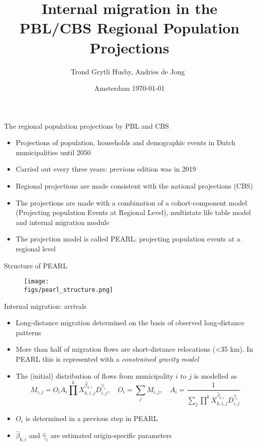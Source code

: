 \documentclass[final, 12pt, aspectratio=169, xcolor={dvipsnames}]{beamer}
\title[PEARL]{Internal migration in the PBL/CBS Regional Population Projections}
\subtitle[PEARL]{}
\author[T. Husby]{Trond Grytli Husby, Andries de Jong\ }
\institute[PBL]{
  Netherlands Environmental Assesment Agency (PBL) \\[5ex]
  \texttt{trond.husby@pbl.nl}
}
\date[\today]{Amsterdam \today}
\newcommand*{\figs}{../figs}%
\begin{document}
\beamertemplatenavigationsymbolsempty

{

  \begin{frame}
    \titlepage
  \end{frame}
}

\begin{frame}{The regional population projections by PBL and CBS}
  \begin{itemize}
    \item  Projections of population, households and demographic events in Dutch municipalities until 2050
  \item Carried out every three years: previous edition was in 2019
  \item Regional projections are made consistent with the national projections (CBS) 
  \item The projections are made with a combination of a cohort-component model (Projecting population Events at Regional Level), multistate life table model and internal migration module
    \item The projection model is called PEARL: projecting population events at a regional level
  \end{itemize}
\end{frame}

\begin{frame}{Structure of PEARL}
  \begin{figure}
      \texttt{[image: \\figs/pearl\_structure.png]}
    \end{figure}
\end{frame}


\begin{frame}{Internal migration: arrivals}
  \begin{itemize}
  \item Long-distance migration determined on the basis of observed long-distance patterns
  \item More than half of migration flows are short-distance relocations (<35 km). In PEARL this is represented with a \textit{constrained gravity model}
  \item The (initial) distribution of flows from municipality $i$ to $j$ is modelled as
    \begin{equation}
      M_{i,j} = O_{i}A_{i}\prod\limits^{k}X_{k,i,j}^{\hat{\beta}_{k,i}}D_{i,j}^{\hat{\gamma}_{i}},
      \quad O_{i} = \sum\limits_{j} M_{i,j},
      \quad A_{i} = \frac{1}{\sum\limits_{j}\prod\limits^{k}X_{k,i,j}^{\hat{\beta}_{k,i}}D_{i,j}^{\hat{\gamma}_{i}}}
    \end{equation}
  \item $O_{i}$ is determined in a previous step in PEARL
    \item $\hat{\beta}_{k,i}$ and $\hat{\gamma}_{i}$ are estimated origin-specific parameters
  \end{itemize}
\end{frame}
\end{document}
